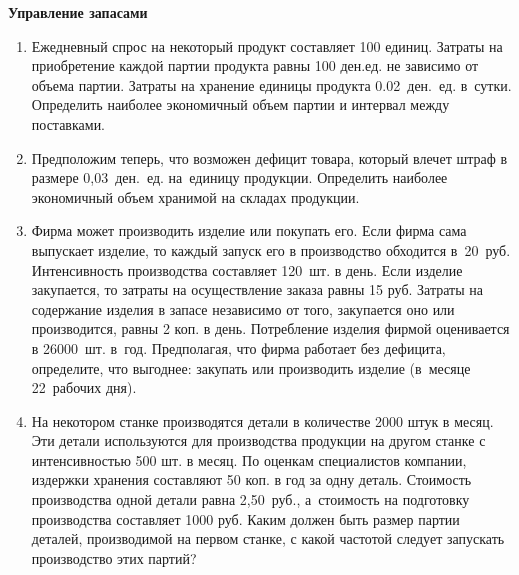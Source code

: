 \documentclass[a5paper,11pt]{extarticle}
\begin{document}
\newpage
{
\bfseries Управление запасами
\par\vspace{1mm}
}
\begin{enumerate}
    \item Ежедневный спрос на некоторый продукт составляет 100 единиц.
    Затраты на приобретение каждой партии продукта равны 100 ден.\;ед. не зависимо от объема партии.
    Затраты на хранение единицы продукта 0.02~ден.~ед. в~сутки. 
    Определить наиболее экономичный объем партии и интервал между поставками.
    \item Предположим теперь, что возможен дефицит товара, который влечет штраф в размере 0,03~ден.~ед. на~единицу продукции. Определить наиболее экономичный объем хранимой на складах продукции.
    \item Фирма может производить изделие или покупать его. Если фирма сама выпускает изделие, то каждый запуск его в производство обходится в~20~руб. Интенсивность производства составляет 120~шт. в день. Если изделие закупается, то затраты на осуществление заказа равны 15 руб. Затраты на содержание изделия в запасе независимо от того, закупается оно или производится, равны 2 коп. в день. Потребление изделия фирмой оценивается в 26000~шт. в~год.
    Предполагая, что фирма работает без дефицита, определите, что выгоднее: закупать или производить изделие (в~месяце 22~рабочих дня).
    \item На некотором станке производятся детали в количестве 2000 штук в месяц. Эти детали используются для производства продукции на другом станке с интенсивностью 500 шт. в месяц. По оценкам специалистов компании, издержки хранения составляют 50 коп. в год за одну деталь. Стоимость производства одной детали равна 2,50~руб., а~стоимость на подготовку производства составляет 1000 руб. Каким должен быть размер партии деталей, производимой на первом станке, с какой частотой следует запускать производство этих партий?
\end{enumerate}
\end{document}
